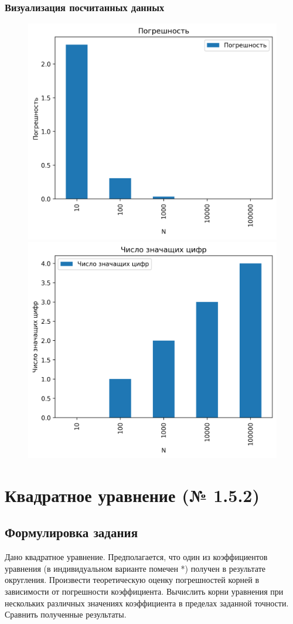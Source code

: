 \documentclass[a4paper,11pt]{article}
\theoremstyle{definition} %
\theoremstyle{remark} %
\begin{document}


\subsubsection{Визуализация посчитанных данных}

\begin{figure}[h]
    \includegraphics[width=0.49\linewidth]{../../calculate_sum/errors}
    \includegraphics[width=0.49\linewidth]{../../calculate_sum/digits}
\end{figure}

\newpage
\section{Квадратное уравнение (№ 1.5.2)}
\subsection{Формулировка задания}

Дано квадратное уравнение. Предполагается, что один из коэффициентов уравнения (в индивидуальном варианте помечен *) получен в результате округления. Произвести теоретическую оценку погрешностей корней в зависимости от погрешности коэффициента. Вычислить корни уравнения при нескольких различных значениях коэффициента в пределах заданной точности. Сравнить полученные результаты.
\end{document}
